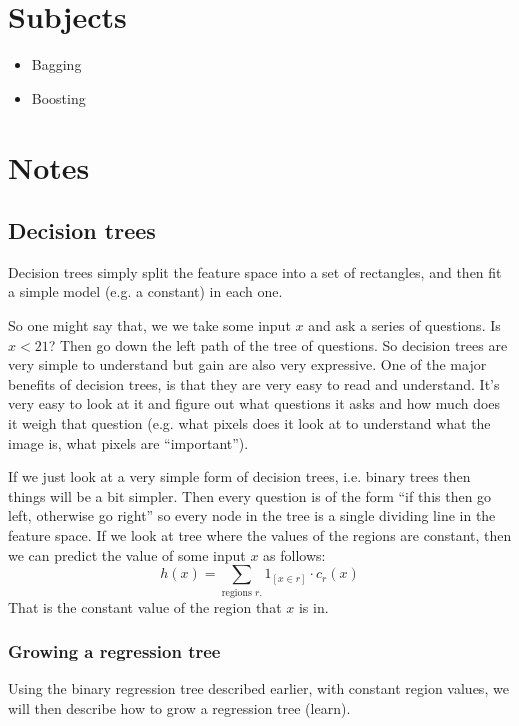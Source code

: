 


    \section{Subjects}
    \begin{itemize}
        \item Bagging
        \item Boosting
    \end{itemize}
    
    \section{Notes}
    
    \subsection{Decision trees}
    Decision trees simply split the feature space into a set of rectangles, and 
    then fit a simple model (e.g. a constant) in each one.
    
    So one might say that, we we take some input $x$ and ask a series of 
    questions. Is $x < 21$? Then go down the left path of the tree of 
    questions. So decision trees are very simple to understand but gain are 
    also very expressive. One of the major benefits of decision trees, is that 
    they are very easy to read and understand. It's very easy to look at it and 
    figure out what questions it asks and how much does it weigh that question 
    (e.g. what pixels does it look at to understand what the image is, what 
    pixels are ``important'').
    
    If we just look at a very simple form of decision trees, i.e. binary trees 
    then things will be a bit simpler. Then every question is of the form ``if 
    this then go left, otherwise go right'' so every node in the tree is a 
    single dividing line in the feature space. If we look at tree where the 
    values of the regions are constant, then we can predict the value of 
    some input $x$ as follows:
    \begin{equation*}
        h(x)=\sum_{\text{regions } r.} 1_{[x\in r]} \cdot c_r(x)
    \end{equation*}
    That is the constant value of the region that $x$ is in.
    
    \subsubsection{Growing a regression tree}
    Using the binary regression tree described earlier, with constant region 
    values, we will then describe how to grow a regression tree (learn).
    
